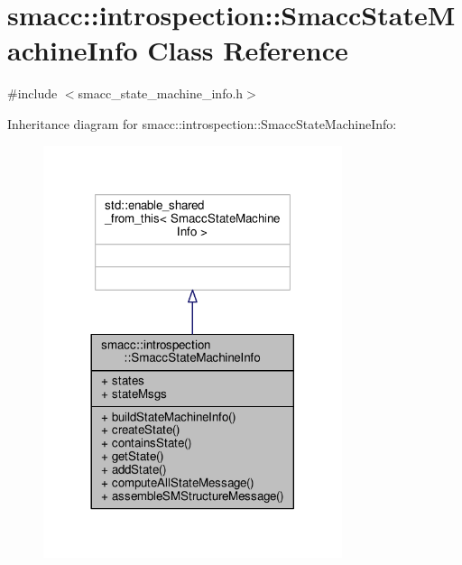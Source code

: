 \hypertarget{classsmacc_1_1introspection_1_1SmaccStateMachineInfo}{}\section{smacc\+:\+:introspection\+:\+:Smacc\+State\+Machine\+Info Class Reference}
\label{classsmacc_1_1introspection_1_1SmaccStateMachineInfo}


{\ttfamily \#include $<$smacc\+\_\+state\+\_\+machine\+\_\+info.\+h$>$}



Inheritance diagram for smacc\+:\+:introspection\+:\+:Smacc\+State\+Machine\+Info\+:\nopagebreak
\begin{figure}[H]
\begin{center}
\leavevmode
\includegraphics[width=248pt]{classsmacc_1_1introspection_1_1SmaccStateMachineInfo__inherit__graph}
\end{center}
\end{figure}


